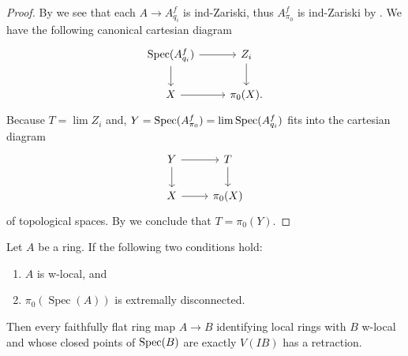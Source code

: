 \begin{proof}
  By  we see that each \(A \to A^f_{q_i}\) is ind-Zariski, thus $A^f_{\pi_0}$ is ind-Zariski by . We have the following canonical cartesian diagram
  \[
  \begin{tikzcd}
  \Spec (A^f_{q_i}) \arrow[r] \arrow[d] & Z_i \arrow[d] \\
  X \arrow[r] & \pi_0(X).
  \end{tikzcd}
  \]
  Because $T = \lim Z_i$ and, $Y = \operatorname{Spec} (A^f_{\pi_0}) = \lim \operatorname{Spec} (A^f_{q_i})$ fits into the cartesian diagram
  \[
  \begin{tikzcd}
  Y \arrow[r] \arrow[d] & T \arrow[d] \\
  X \arrow[r] & \pi_0(X)
  \end{tikzcd}
  \]
  of topological spaces. By  we conclude that $T = \pi_0(Y)$.
\end{proof}

\begin{lemma}
  \label{thm:ff-identifies-local-rings-plus-c-has-retraction-if}
  Let $A$ be a ring. If the following two conditions hold:
  \begin{enumerate}
    \item $A$ is w-local, and
    \item $\pi_0(\operatorname{Spec}(A))$ is extremally disconnected.
  \end{enumerate}
  Then every faithfully flat ring map $A \to B$ identifying local rings with \(B\) w-local and whose closed points of \(\operatorname{Spec} (B)\) are exactly \(V(IB)\) has a retraction.
\end{lemma}

